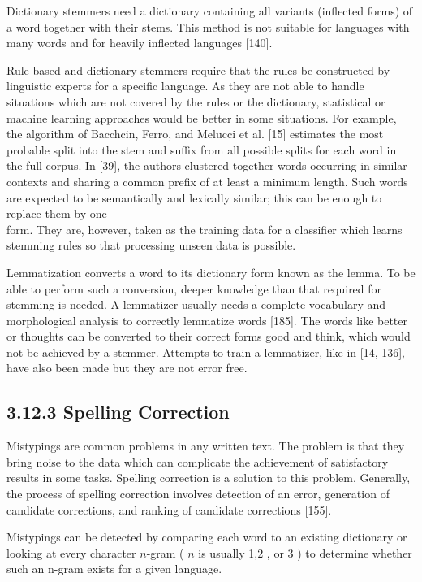 \documentclass[10pt]{book}
\begin{document}
Dictionary stemmers need a dictionary containing all variants (inflected forms) of a word together with their stems. This method is not suitable for languages with many words and for heavily inflected languages [140].

Rule based and dictionary stemmers require that the rules be constructed by linguistic experts for a specific language. As they are not able to handle situations which are not covered by the rules or the dictionary, statistical or machine learning approaches would be better in some situations. For example, the algorithm of Bacchcin, Ferro, and Melucci et al. [15] estimates the most probable split into the stem and suffix from all possible splits for each word in the full corpus. In [39], the authors clustered together words occurring in similar contexts and sharing a common prefix of at least a minimum length. Such words are expected to be semantically and lexically similar; this can be enough to replace them by one\\
form. They are, however, taken as the training data for a classifier which learns stemming rules so that processing unseen data is possible.

Lemmatization converts a word to its dictionary form known as the lemma. To be able to perform such a conversion, deeper knowledge than that required for stemming is needed. A lemmatizer usually needs a complete vocabulary and morphological analysis to correctly lemmatize words [185]. The words like better or thoughts can be converted to their correct forms good and think, which would not be achieved by a stemmer. Attempts to train a lemmatizer, like in [14, 136], have also been made but they are not error free.

\subsection*{3.12.3 Spelling Correction}
Mistypings are common problems in any written text. The problem is that they bring noise to the data which can complicate the achievement of satisfactory results in some tasks. Spelling correction is a solution to this problem. Generally, the process of spelling correction involves detection of an error, generation of candidate corrections, and ranking of candidate corrections [155].

Mistypings can be detected by comparing each word to an existing dictionary or looking at every character $n$-gram ( $n$ is usually 1,2 , or 3 ) to determine whether such an n-gram exists for a given language.
\end{document}
